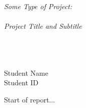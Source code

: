 \documentclass{article}
\begin{document}
\thispagestyle{empty}

\vspace*{\fill}

\begin{center}


\vspace{20pt}

\color{darkblue}

\Huge \em
Some Type of Project: \\
\ \\
Project Title and  Subtitle\\

\ \\


\ \\ 
\ \\

\large
Student Name \\
Student ID

\vspace{20pt}


\end{center}

\vfill

\clearpage

\setcounter{page}{1}

Start of report...
\end{document}
